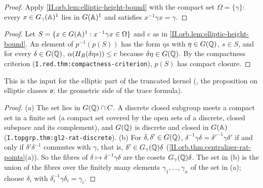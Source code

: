 \begin{corollary}
\end{corollary}
\begin{proof}
Apply \cref{II.orb.lem:elliptic-height-bound} with the compact set $\Omega=\{\gamma\}$: every $x\in G_\gamma(\mathbb{A})^1$ lies in $G(\mathbb{A})^1$ and satisfies
$x^{-1}\gamma x=\gamma$.
\end{proof}

\begin{theorem}
\end{theorem}
\begin{proof}
Let $S=\{x\in G(\mathbb{A})^1:x^{-1}\gamma x\in\Omega\}$ and $c$ as in \cref{II.orb.lem:elliptic-height-bound}. An element of $p^{-1}(p(S))$ has the form
$\eta s$ with $\eta\in G(\mathbb{Q})$, $s\in S$, and for every $\delta\in G(\mathbb{Q})$, $\alpha(H_B(\delta\eta s))\le c$ because $\delta\eta\in G(\mathbb{Q})$. By the
compactness criterion (\texttt{I.red.thm:compactness-criterion}), $p(S)$ has compact closure.
\end{proof}
\noindent This is the input for the elliptic part of the truncated kernel (\cite[Lecture II §2]{Gel}, the proposition on elliptic classes $\mathfrak o$;
the geometric side of the trace formula).

\begin{lemma}
\end{lemma}
\begin{proof}
(a) The set lies in $G(\mathbb{Q})\cap C$. A discrete closed subgroup meets a compact set in a finite set (a compact set covered by the open
sets of a discrete, closed subspace and its complement), and $G(\mathbb{Q})$ is discrete and closed in $G(\mathbb{A})$ (\texttt{I.topgrp.thm:gl2-rat-discrete}).
(b) For $\delta,\delta'\in G(\mathbb{Q})$, $\delta^{-1}\gamma\delta=\delta'^{-1}\gamma\delta'$ if and only if $\delta'\delta^{-1}$ commutes with $\gamma$, that is,
$\delta'\in G_\gamma(\mathbb{Q})\delta$ (\cref{II.orb.thm:centralizer-rat-points}(a)). So the fibres of $\delta\mapsto\delta^{-1}\gamma\delta$ are the cosets
$G_\gamma(\mathbb{Q})\delta$. The set in (b) is the union of the fibres over the finitely many elements $\gamma_1,\dots,\gamma_n$ of the set in (a); choose
$\delta_i$ with $\delta_i^{-1}\gamma\delta_i=\gamma_i$.
\end{proof}


